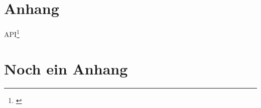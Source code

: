 \appendix
\section{Anhang} %
\label{sec:anhang}
\ac{API}\footnote{\cite{gilchrist}}


\section{Noch ein Anhang} %
\label{sec:noch_ein_anhang}

